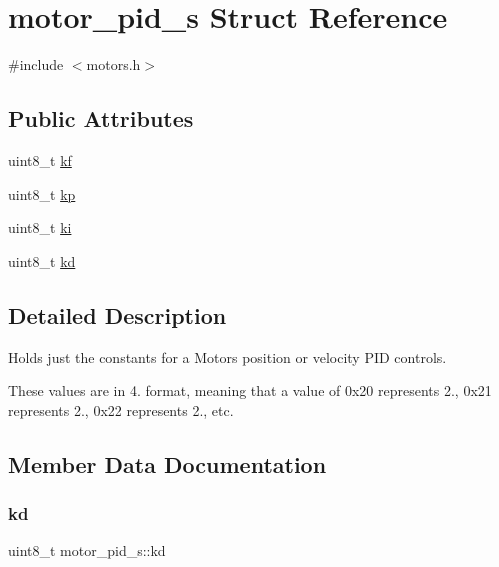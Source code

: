 \hypertarget{structmotor__pid__s}{}\section{motor\+\_\+pid\+\_\+s Struct Reference}
\label{structmotor__pid__s}


{\ttfamily \#include $<$motors.\+h$>$}

\subsection*{Public Attributes}
\begin{DoxyCompactItemize}
\item 
uint8\+\_\+t \hyperlink{structmotor__pid__s_aad53ebe7d1c645811b3dc6cb825bd590}{kf}
\item 
uint8\+\_\+t \hyperlink{structmotor__pid__s_a31c38ff6a4245e81c4db42579b90be31}{kp}
\item 
uint8\+\_\+t \hyperlink{structmotor__pid__s_ac894dd6c3683c2daa403b81e259a1cae}{ki}
\item 
uint8\+\_\+t \hyperlink{structmotor__pid__s_a5241cf4e6e0b3aed6cf9fc52d83769ab}{kd}
\end{DoxyCompactItemize}


\subsection{Detailed Description}
Holds just the constants for a Motor\textquotesingle{}s position or velocity P\+ID controls.

These values are in 4. format, meaning that a value of 0x20 represents 2., 0x21 represents 2., 0x22 represents 2., etc. 

\subsection{Member Data Documentation}
\mbox{\label{structmotor__pid__s_a5241cf4e6e0b3aed6cf9fc52d83769ab}} 
\subsubsection{\texorpdfstring{kd}{kd}}
{\footnotesize\ttfamily uint8\+\_\+t motor\+\_\+pid\+\_\+s\+::kd}

